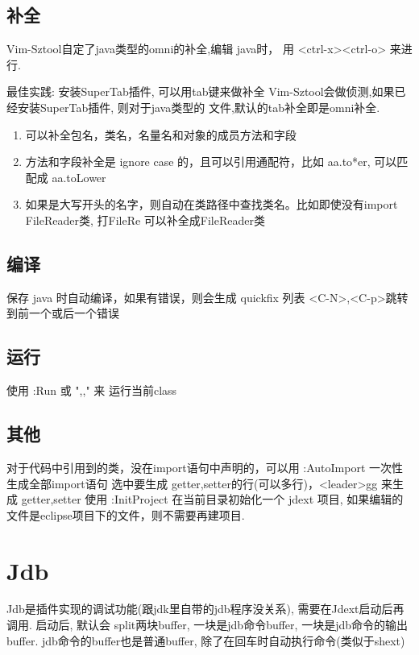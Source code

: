 \documentclass[oneside,openany]{book}
\begin{document}
\subsection{补全}
    Vim-Sztool自定了java类型的omni的补全,编辑 java时， 用 <ctrl-x><ctrl-o> 来进行.
    \begin{mdframed}[style=BestPracticeFrame]
      最佳实践: 安装SuperTab插件, 可以用tab键来做补全
      Vim-Sztool会做侦测,如果已经安装SuperTab插件, 则对于java类型的
      文件,默认的tab补全即是omni补全.
    \end{mdframed}

    \begin{enumerate}
      \item 可以补全包名，类名，名量名和对象的成员方法和字段
      \item 方法和字段补全是 ignore case 的，且可以引用通配符，比如 aa.to*er, 可以匹配成 aa.toLower
      \item 如果是大写开头的名字，则自动在类路径中查找类名。比如即使没有import FileReader类, 打FileRe 可以补全成FileReader类 
    \end{enumerate}
    
\subsection{编译}
    保存 java 时自动编译，如果有错误，则会生成 quickfix 列表 <C-N>,<C-p>跳转到前一个或后一个错误 

\subsection{运行}
    使用 :Run 或 ",," 来 运行当前class 

\subsection{其他}
    对于代码中引用到的类，没在import语句中声明的，可以用 :AutoImport 一次性生成全部import语句 
    \newline
    \newline
    选中要生成 getter,setter的行(可以多行)，<leader>gg 来生成 getter,setter 
    \newline
    \newline
    使用 :InitProject 在当前目录初始化一个 jdext 项目, 如果编辑的文件是eclipse项目下的文件，则不需要再建项目. 
    \newline

\section{Jdb}
    Jdb是插件实现的调试功能(跟jdk里自带的jdb程序没关系), 需要在Jdext启动后再调用. 启动后, 默认会 
    split两块buffer, 一块是jdb命令buffer, 一块是jdb命令的输出buffer. jdb命令的buffer也是普通buffer, 除了在回车时自动执行命令(类似于shext) 
\end{document}
